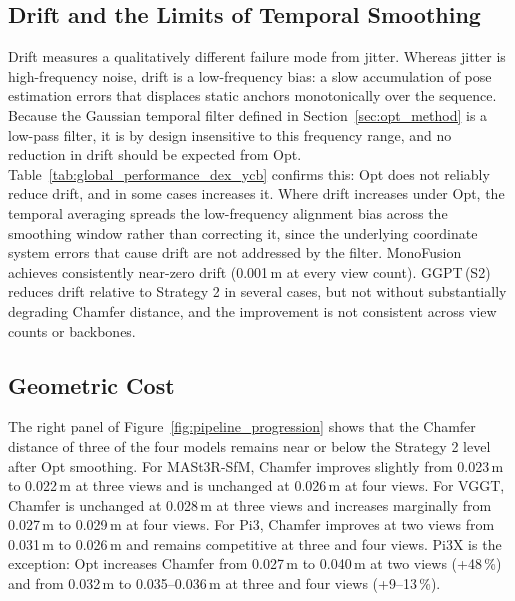 \subsection{Drift and the Limits of Temporal Smoothing}
Drift measures a qualitatively different failure mode from jitter.
Whereas jitter is high-frequency noise, drift is a low-frequency bias:
a slow accumulation of pose estimation errors that displaces static
anchors monotonically over the sequence. Because the Gaussian temporal
filter defined in Section~\ref{sec:opt_method} is a low-pass filter,
it is by design insensitive to this frequency range, and no reduction
in drift should be expected from Opt. Table~\ref{tab:global_performance_dex_ycb}
confirms this: Opt does not reliably reduce drift, and in some cases
increases it. Where drift increases under Opt, the temporal averaging
spreads the low-frequency alignment bias across the smoothing window
rather than correcting it, since the underlying coordinate system errors
that cause drift are not addressed by the filter.
MonoFusion achieves consistently near-zero drift (0.001\,m at every
view count).
GGPT\,(S2) reduces drift relative to Strategy 2 in several cases,
but not without substantially degrading Chamfer distance, and the
improvement is not consistent across view counts or backbones.

\subsection{Geometric Cost}
The right panel of Figure~\ref{fig:pipeline_progression} shows that the Chamfer
distance of three of the four models remains near or below the Strategy 2 level after
Opt smoothing. For MASt3R-SfM, Chamfer improves slightly from 0.023\,m to 0.022\,m
at three views and is unchanged at 0.026\,m at four views. For VGGT, Chamfer is
unchanged at 0.028\,m at three views and increases marginally from 0.027\,m to
0.029\,m at four views. For Pi3, Chamfer improves at two views from 0.031\,m to
0.026\,m and remains competitive at three and four views. Pi3X is the exception: Opt
increases Chamfer from 0.027\,m to 0.040\,m at two views (+48\,\%) and from 0.032\,m
to 0.035--0.036\,m at three and four views (+9--13\,\%).

